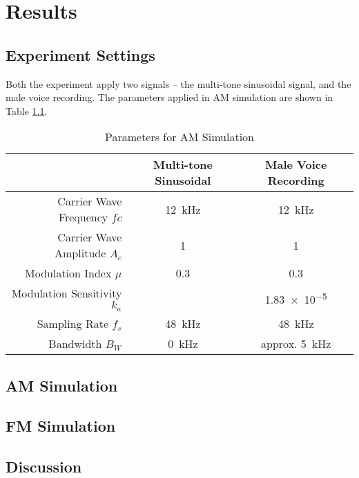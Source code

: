 \documentclass[../ECE459FinalProjectReport.tex]{subfiles}
\begin{document}
\chapter{Results}
\section{Experiment Settings}
Both the experiment apply two signals -- the multi-tone sinusoidal signal, and the male voice recording. The parameters applied in AM simulation are shown in Table \ref{tb:AM-param}.
\begin{table}[tb]
    \centering
    \caption{Parameters for AM Simulation}
    \label{tb:AM-param}
    \begin{tabular}{@{}r|c|c@{}}
        \toprule
                                     & Multi-tone Sinusoidal & Male Voice Recording \\\midrule
        Carrier Wave Frequency $fc$  & \SI{12}{kHz}          & \SI{12}{kHz}         \\
        Carrier Wave Amplitude $A_c$ & 1                     & 1                    \\
        Modulation Index $\mu$       & 0.3                   & 0.3                  \\
        Modulation Sensitivity $k_a$ &                       & \num{1.83e-5}        \\
        Sampling Rate $f_s$          & \SI{48}{kHz}          & \SI{48}{kHz}         \\
        Bandwidth $B_W$              & \SI{0}{kHz}          & approx. \SI{5}{kHz}\\ \bottomrule
    \end{tabular}
\end{table}

\section{AM Simulation}

\section{FM Simulation}

\section{Discussion}
\end{document}
